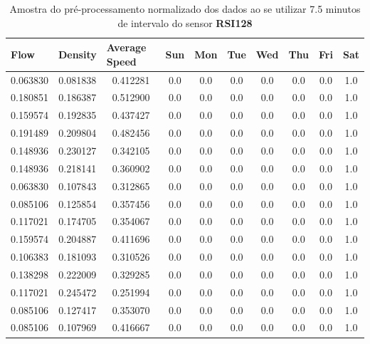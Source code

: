 \begin{table}[h]
    \begin{tabular}{cccccccccc}
    \toprule
    \multicolumn{1}{l}{\textbf{Flow}} & \multicolumn{1}{l}{\textbf{Density}} & \multicolumn{1}{l}{\textbf{Average Speed}} & \multicolumn{1}{l}{\textbf{Sun}} &
    \multicolumn{1}{l}{\textbf{Mon}} & \multicolumn{1}{l}{\textbf{Tue}} & \multicolumn{1}{l}{\textbf{Wed}} & \multicolumn{1}{l}{\textbf{Thu}} &
    \multicolumn{1}{l}{\textbf{Fri}} &
    \multicolumn{1}{l}{\textbf{Sat}} \\
    \midrule
    0.063830 & 0.081838 & 0.412281 & 0.0 & 0.0 & 0.0 & 0.0 & 0.0 & 0.0 & 1.0 \\
    \midrule
    0.180851 & 0.186387 & 0.512900 & 0.0 & 0.0 & 0.0 & 0.0 & 0.0 & 0.0 & 1.0 \\
    \midrule
    0.159574 & 0.192835 & 0.437427 & 0.0 & 0.0 & 0.0 & 0.0 & 0.0 & 0.0 & 1.0 \\
    \midrule
    0.191489 & 0.209804 & 0.482456 & 0.0 & 0.0 & 0.0 & 0.0 & 0.0 & 0.0 & 1.0 \\
    \midrule
    0.148936 & 0.230127 & 0.342105 & 0.0 & 0.0 & 0.0 & 0.0 & 0.0 & 0.0 & 1.0 \\
    \midrule
    0.148936 & 0.218141 & 0.360902 & 0.0 & 0.0 & 0.0 & 0.0 & 0.0 & 0.0 & 1.0 \\
    \midrule
    0.063830 & 0.107843 & 0.312865 & 0.0 & 0.0 & 0.0 & 0.0 & 0.0 & 0.0 & 1.0 \\
    \midrule
    0.085106 & 0.125854 & 0.357456 & 0.0 & 0.0 & 0.0 & 0.0 & 0.0 & 0.0 & 1.0 \\
    \midrule
    0.117021 & 0.174705 & 0.354067 & 0.0 & 0.0 & 0.0 & 0.0 & 0.0 & 0.0 & 1.0 \\
    \midrule
    0.159574 & 0.204887 & 0.411696 & 0.0 & 0.0 & 0.0 & 0.0 & 0.0 & 0.0 & 1.0 \\
    \midrule
    0.106383 & 0.181093 & 0.310526 & 0.0 & 0.0 & 0.0 & 0.0 & 0.0 & 0.0 & 1.0 \\
    \midrule
    0.138298 & 0.222009 & 0.329285 & 0.0 & 0.0 & 0.0 & 0.0 & 0.0 & 0.0 & 1.0 \\
    \midrule
    0.117021 & 0.245472 & 0.251994 & 0.0 & 0.0 & 0.0 & 0.0 & 0.0 & 0.0 & 1.0 \\
    \midrule
    0.085106 & 0.127417 & 0.353070 & 0.0 & 0.0 & 0.0 & 0.0 & 0.0 & 0.0 & 1.0 \\
    \midrule
    0.085106 & 0.107969 & 0.416667 & 0.0 & 0.0 & 0.0 & 0.0 & 0.0 & 0.0 & 1.0 \\
    \bottomrule
    \end{tabular}
    \label{table:data_pre_norm}
    \caption{Amostra do pré-processamento normalizado dos dados ao se utilizar 7.5 minutos de intervalo do sensor \textbf{RSI128}}
\end{table}

